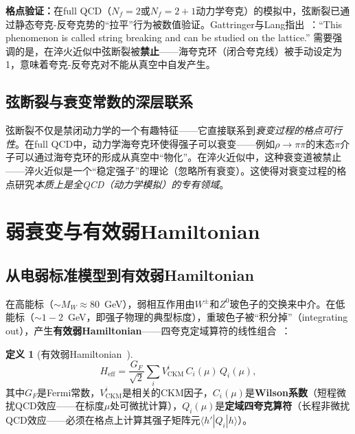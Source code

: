 \documentclass[12pt,a4paper]{ctexart}
\theoremstyle{definition}
\newtheorem{definition}{定义}[section]
\begin{document}
\textbf{格点验证：}在full QCD（$N_f=2$或$N_f=2+1$动力学夸克）的模拟中，弦断裂已通过静态夸克-反夸克势的``拉平''行为被数值验证。Gattringer与Lang指出~\cite{GattringerLang2010}：``This phenomenon is called string breaking and can be studied on the lattice.'' 需要强调的是，在淬火近似中弦断裂被\textbf{禁止}——海夸克环（闭合夸克线）被手动设定为1，意味着夸克-反夸克对不能从真空中自发产生。

\subsection{弦断裂与衰变常数的深层联系}

弦断裂不仅是禁闭动力学的一个有趣特征——它直接联系到\emph{衰变过程的格点可行性}。在full QCD中，动力学海夸克环使得强子可以衰变——例如$\rho \to \pi\pi$的末态$\pi$介子可以通过海夸克环的形成从真空中``物化''。在淬火近似中，这种衰变道被禁止——淬火近似是一个``稳定强子''的理论（忽略所有衰变）。这使得对衰变过程的格点研究\emph{本质上是全QCD（动力学模拟）的专有领域}。

\section{弱衰变与有效弱Hamiltonian}

\subsection{从电弱标准模型到有效弱Hamiltonian}

在高能标（$\sim M_W \approx 80$~GeV），弱相互作用由$W^\pm$和$Z^0$玻色子的交换来中介。在低能标（$\sim 1-2$~GeV，即强子物理的典型标度），重玻色子被``积分掉''（integrating out），产生\textbf{有效弱Hamiltonian}——四夸克定域算符的线性组合~\cite{GattringerLang2010}：

\begin{definition}[有效弱Hamiltonian~\cite{GattringerLang2010}]
\begin{equation}
\boxed{H_{\text{eff}} = \frac{G_F}{\sqrt{2}} \sum_i V_{\text{CKM}}^i \, C_i(\mu) \, Q_i(\mu)},
\label{eq:eff_weak_H}
\end{equation}
其中$G_F$是Fermi常数，$V_{\text{CKM}}^i$是相关的CKM因子，$C_i(\mu)$是\textbf{Wilson系数}（短程微扰QCD效应——在标度$\mu$处可微扰计算），$Q_i(\mu)$是\textbf{定域四夸克算符}（长程非微扰QCD效应——必须在格点上计算其强子矩阵元$\langle h'|Q_i|h\rangle$）。
\end{definition}
\end{document}
